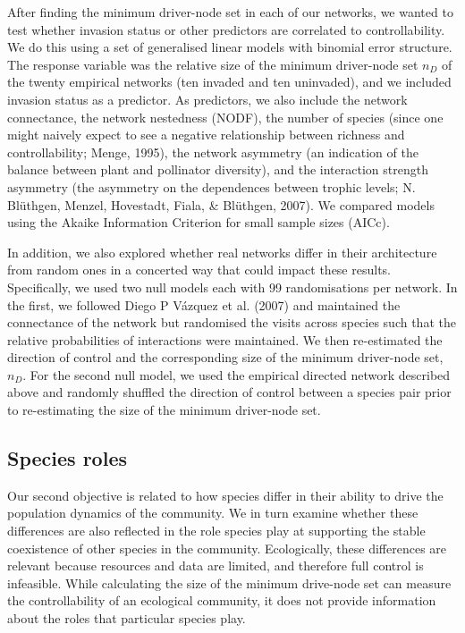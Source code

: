 \documentclass[a4paper]{artikel1}
\theoremstyle{definition}
\theoremstyle{definition}
\theoremstyle{definition}
\theoremstyle{remark}
\begin{document}
After finding the minimum driver-node set in each of our networks, we
wanted to test whether invasion status or other predictors are
correlated to controllability. We do this using a set of generalised
linear models with binomial error structure. The response variable was
the relative size of the minimum driver-node set \(n_D\) of the twenty
empirical networks (ten invaded and ten uninvaded), and we included
invasion status as a predictor. As predictors, we also include the
network connectance, the network nestedness (NODF), the number of
species (since one might naively expect to see a negative relationship
between richness and controllability; Menge, 1995), the network
asymmetry (an indication of the balance between plant and pollinator
diversity), and the interaction strength asymmetry (the asymmetry on the
dependences between trophic levels; N. Blüthgen, Menzel, Hovestadt,
Fiala, \& Blüthgen, 2007). We compared models using the Akaike
Information Criterion for small sample sizes (AICc).

In addition, we also explored whether real networks differ in their
architecture from random ones in a concerted way that could impact these
results. Specifically, we used two null models each with 99
randomisations per network. In the first, we followed Diego P Vázquez et
al. (2007) and maintained the connectance of the network but randomised
the visits across species such that the relative probabilities of
interactions were maintained. We then re-estimated the direction of
control and the corresponding size of the minimum driver-node set,
\(n_D\). For the second null model, we used the empirical directed
network described above and randomly shuffled the direction of control
between a species pair prior to re-estimating the size of the minimum
driver-node set.

\subsection{Species roles}\label{species-roles}

Our second objective is related to how species differ in their ability
to drive the population dynamics of the community. We in turn examine
whether these differences are also reflected in the role species play at
supporting the stable coexistence of other species in the community.
Ecologically, these differences are relevant because resources and data
are limited, and therefore full control is infeasible. While calculating
the size of the minimum drive-node set can measure the controllability
of an ecological community, it does not provide information about the
roles that particular species play.
\end{document}
